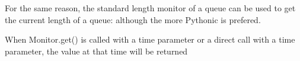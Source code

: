 \documentclass[letterpaper,10pt,english]{sphinxmanual}
\begin{document}
\begin{sphinxVerbatim}[commandchars=\\\{\}]
    
   
\end{sphinxVerbatim}

For the same reason, the standard length monitor of a queue can be used to get the current length of a queue:  although
the more Pythonic  is prefered.

When Monitor.get() is called with a time parameter or a direct call with a time parameter, the value at that time will be returned

\begin{sphinxVerbatim}[commandchars=\\\{\}]
   
   
\end{sphinxVerbatim}
\end{document}
